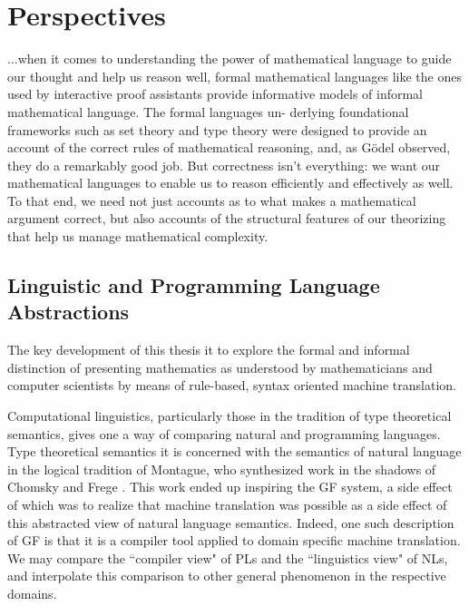 \section{Perspectives}

\begin{displayquote}

...when it comes to understanding the power of mathematical language to guide our
thought and help us reason well, formal mathematical languages like the ones
used by interactive proof assistants provide informative models of informal
mathematical language. The formal languages un- derlying foundational frameworks
such as set theory and type theory were designed to provide an account of the
correct rules of mathematical reasoning, and, as Gödel observed, they do a
remarkably good job. But correctness isn’t everything: we want our mathematical
languages to enable us to reason efficiently and effectively as well. To that
end, we need not just accounts as to what makes a mathematical argument correct,
but also accounts of the structural features of our theorizing that help us
manage mathematical complexity.\cite{avigad2015mathematics}

\end{displayquote}

\subsection{Linguistic and Programming Language Abstractions}

The key development of this thesis it to explore the formal and informal
distinction of presenting mathematics as understood by mathematicians and computer
scientists by means of rule-based, syntax oriented machine translation.

Computational linguistics, particularly those in the tradition of type
theoretical semantics\cite{ranta1994type}, gives one a way of comparing natural
and programming languages. Type theoretical semantics it is concerned with the
semantics of natural language in the logical tradition of Montague, who
synthesized work in the shadows of Chomsky \cite{Chomsky57} and Frege
\cite{frege79}. This work ended up inspiring the GF system, a side effect of
which was to realize that machine translation was possible as a side effect of
this abstracted view of natural language semantics. Indeed, one such description
of GF is that it is a compiler tool applied to domain specific machine
translation. We may compare the ``compiler view" of PLs and the ``linguistics view"
of NLs, and interpolate this comparison to other general phenomenon in the
respective domains.

